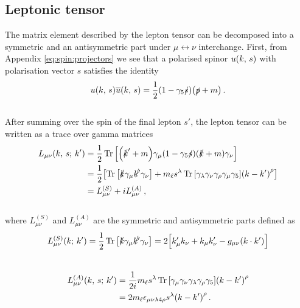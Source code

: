 \subsection*{Leptonic tensor}
The matrix element described by the lepton tensor can be decomposed into a symmetric and an antisymmetric part under $\mu \leftrightarrow \nu$ interchange. First, from Appendix \eqref{eq:spin:projectors} we see that a polarised spinor $u \qty(k, \, s)$ with polarisation vector $s$ satisfies the identity 
\\
\begin{equation}
    u \qty(k, \, s) \overline{u} \qty(k,\,s) = \frac{1}{2} (1 - \gamma_5 \slashed{s})  \qty(\slashed{p} + m)\,.
\end{equation}
\\
After summing over the spin of the final lepton $s'$, the lepton tensor can be written as a trace over gamma matrices
\\
\begin{equation}
    \begin{split}
        L_{\mu \nu} \qty(k,\,s;\, k') &= \frac{1}{2} \Trace \qty[ \qty(\slashed{k}' + m) \gamma_{\mu} \qty(1 - \gamma_5 \slashed{s}) \qty(\slashed{k} + m) \gamma_{\nu} ]\\
        & = \frac{1}{2} \qty[ \Trace \qty[ \slashed{k} \gamma_{\mu} \slashed{k'} \gamma_{\nu} ] + m_{\ell} s^{\lambda} \Trace \qty[ \gamma_{\lambda} \gamma_{\nu} \gamma_{\rho} \gamma_{\mu} \gamma_{5} ] \qty( k - k' )^{\rho} ]\\
        & = L_{\mu \nu}^{(S)} + i L_{\mu \nu}^{(A)} \,,
    \end{split}
\end{equation}
\\
where $L_{\mu \nu}^{(S)}$ and $L_{\mu \nu}^{(A)}$ are the symmetric and antisymmetric parts defined as 
\\
\begin{equation}
    L_{\mu \nu}^{(S)} \qty(k;\, k') = \frac{1}{2} \Trace \qty[ \slashed{k} \gamma_{\mu} \slashed{k'} \gamma_{\nu} ] = 2 \Bigl[k'_{\mu} k_{\nu} + k_{\mu} k_{\nu}' - g_{\mu \nu} \qty( k \cdot k' ) \Bigr]
\end{equation}
\\
\begin{equation}
    \begin{split}
        L_{\mu \nu}^{(A)} \qty(k,\,s;\, k') & = \frac{1}{2i} m_{\ell} s^{\lambda} \Trace \qty[  \gamma_{\mu} \gamma_{\nu} \gamma_{\lambda} \gamma_{\rho} \gamma_{5} ] \qty( k - k' )^{\rho} \\
    &  = 2m_{\ell} \epsilon_{\mu \nu \lambda  4\rho } s^{\lambda} \qty( k - k' )^{\rho}\,.
    \end{split}
\end{equation}
